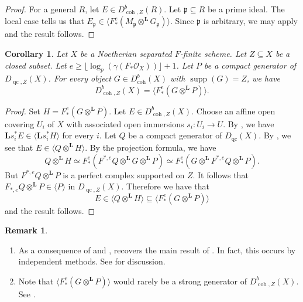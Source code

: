 \documentclass[11pt]{amsart}
\theoremstyle{plain}
\newtheorem{corollary}[theorem]{Corollary}
\theoremstyle{definition}
\newtheorem{remark}[theorem]{Remark}
\numberwithin{equation}{section}
\numberwithin{theorem}{section}
\begin{document}
\begin{proof}
    For a general $R$, let $E\in D_{\operatorname{coh},Z}^b(R)$. Let $\mathfrak{p}\subseteq R$ be a prime ideal. The local case tells us that $E_\mathfrak{p}\in \langle F_\ast^e (M_\mathfrak{p}\otimes^\mathbf{L}G_\mathfrak{p})\rangle$. Since $\mathfrak{p}$ is arbitrary, we may apply \cite[Theorem 3.6]{Letz:2021} and the result follows.
\end{proof}

\begin{corollary}
    \label{prop:relative_Frobenius_generation_schemes}
    Let $X$ be a Noetherian separated $F$-finite scheme. 
    Let $Z\subseteq X$ be a closed subset. 
    Let $e \geq \lfloor \log_p (\gamma(F_\ast \mathcal{O}_X))\rfloor + 1$. Let $P$ be a compact generator of $D_{\operatorname{qc},Z}(X)$. 
    For every object $G\in D_{\operatorname{coh}}^b(X)$ with $\operatorname{supp}(G)=Z$, we have
    \begin{displaymath}
        D^b_{\operatorname{coh},Z}(X)= \langle F_\ast^e (G\otimes^\mathbf{L}P) \rangle.
    \end{displaymath}
\end{corollary}

\begin{proof}
    Set $H=F_\ast^e (G\otimes^\mathbf{L}P)$. Let $E\in D^b_{\operatorname{coh},Z}(X)$. Choose an affine open covering $U_i$ of $X$ with associated open immersions $s_i\colon U_i\to U$. By , we have $\mathbf{L}s_i^\ast E\in\langle \mathbf{L}s_i^\ast H\rangle$ for every $i$. Let $Q$ be a compact generator of $D_{\operatorname{qc}}(X)$. By , we see that $E\in\langle Q\otimes^\mathbf{L} H\rangle$. By the projection formula, we have$$Q\otimes^\mathbf{L} H\simeq F_\ast^e(F^{\ast,e}Q\otimes^\mathbf{L}G\otimes^\mathbf{L}P)\simeq F_\ast^e(G\otimes^\mathbf{L}F^{\ast,e}Q\otimes^\mathbf{L}P).$$But $F^{\ast,e}Q\otimes^\mathbf{L}P$ is a perfect complex supported on $Z$. It follows that $F_{\ast,e}Q\otimes^\mathbf{L}P\in\langle P\rangle$ in $D_{\operatorname{qc},Z}(X)$. Therefore we have that$$E\in\langle Q\otimes^\mathbf{L} H\rangle\subseteq \langle F_\ast^e (G\otimes^\mathbf{L}P) \rangle$$and the result follows.
\end{proof}

\begin{remark}
    \hfill
    \begin{enumerate}
        \item As a consequence of  and ,  recovers the main result of \cite{Ballard/Iyengar/Lank/Mukhopadhyay/Pollitz:2023}. In fact, this occurs by independent methods. See  for discussion.
        \item  Note that $\langle F_\ast^e (G\otimes^\mathbf{L}P) \rangle$ would rarely be a strong generator of $D^b_{\operatorname{coh},Z}(X)$. 
        See \cite[Remark 8.1]{Neeman:2022}.
    \end{enumerate}
\end{remark}
\end{document}
